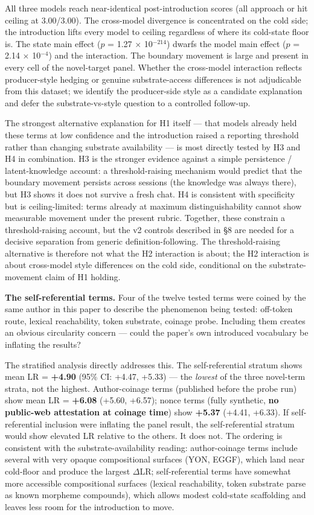 \documentclass[11pt,a4paper]{article}
\begin{document}
All three models reach near-identical post-introduction scores (all approach or hit ceiling at 3.00/3.00). The cross-model divergence is concentrated on the cold side; the introduction lifts every model to ceiling regardless of where its cold-state floor is. The state main effect ($p$ = 1.27 $\times$ 10$^{-214}$) dwarfs the model main effect ($p$ = 2.14 $\times$ 10$^{-4}$) and the interaction. The boundary movement is large and present in every cell of the novel-target panel. Whether the cross-model interaction reflects producer-style hedging or genuine substrate-access differences is not adjudicable from this dataset; we identify the producer-side style as a candidate explanation and defer the substrate-vs-style question to a controlled follow-up.

The strongest alternative explanation for H1 itself --- that models already held these terms at low confidence and the introduction raised a reporting threshold rather than changing substrate availability --- is most directly tested by H3 and H4 in combination. H3 is the stronger evidence against a simple persistence / latent-knowledge account: a threshold-raising mechanism would predict that the boundary movement persists across sessions (the knowledge was always there), but H3 shows it does not survive a fresh chat. H4 is consistent with specificity but is ceiling-limited: terms already at maximum distinguishability cannot show measurable movement under the present rubric. Together, these constrain a threshold-raising account, but the v2 controls described in \S8 are needed for a decisive separation from generic definition-following. The threshold-raising alternative is therefore not what the H2 interaction is about; the H2 interaction is about cross-model style differences on the cold side, conditional on the substrate-movement claim of H1 holding.

\textbf{The self-referential terms.} Four of the twelve tested terms were coined by the same author in this paper to describe the phenomenon being tested: off-token route, lexical reachability, token substrate, coinage probe. Including them creates an obvious circularity concern --- could the paper's own introduced vocabulary be inflating the results?

The stratified analysis directly addresses this. The self-referential stratum shows mean LR = \textbf{+4.90} (95\% CI: +4.47, +5.33) --- the \textit{lowest} of the three novel-term strata, not the highest. Author-coinage terms (published before the probe run) show mean LR = \textbf{+6.08} (+5.60, +6.57); nonce terms (fully synthetic, \textbf{no public-web attestation at coinage time}) show \textbf{+5.37} (+4.41, +6.33). If self-referential inclusion were inflating the panel result, the self-referential stratum would show elevated LR relative to the others. It does not. The ordering is consistent with the substrate-availability reading: author-coinage terms include several with very opaque compositional surfaces (YON, EGGF), which land near cold-floor and produce the largest $\Delta$LR; self-referential terms have somewhat more accessible compositional surfaces (lexical reachability, token substrate parse as known morpheme compounds), which allows modest cold-state scaffolding and leaves less room for the introduction to move.
\end{document}
